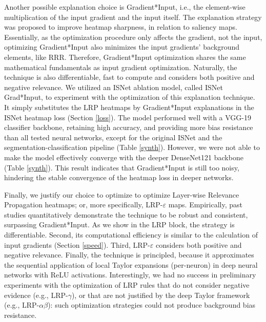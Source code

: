 \documentclass[fleqn,10pt]{wlscirep}
\begin{document}
{Another possible explanation choice is Gradient*Input, i.e., the element-wise multiplication of the input gradient and the input itself. The explanation strategy was proposed to improve heatmap sharpness, in relation to saliency maps\cite{GradInput}. Essentially, as the optimization procedure only affects the gradient, not the input, optimizing Gradient*Input also minimizes the input gradients' background elements, like RRR. Therefore, Gradient*Input optimization shares the same mathematical fundamentals as input gradient optimization. Naturally, the technique is also differentiable, fast to compute and considers both positive and negative relevance. We utilized an ISNet ablation model, called ISNet Grad*Input, to experiment with the optimization of this explanation technique. It simply substitutes the LRP heatmaps by Gradient*Input explanations in the ISNet heatmap loss (Section \ref{loss}). The model performed well with a VGG-19 classifier backbone, retaining high accuracy, and providing more bias resistance than all tested neural networks, except for the original ISNet and the segmentation-classification pipeline (Table \ref{synth}). However, we were not able to make the model effectively converge with the deeper DenseNet121 backbone (Table \ref{synth}). This result indicates that Gradient*Input is still too noisy, hindering the stable convergence of the heatmap loss in deeper networks.

Finally, we justify our choice to optimize to optimize Layer-wise Relevance Propagation heatmaps; or, more specifically, LRP-$\varepsilon$\cite{LRP} maps. Empirically, past studies quantitatively demonstrate the technique to be robust and consistent, surpassing Gradient*Input\cite{LRPRobustness}. As we show in the LRP block, the strategy is differentiable. Second, its computational efficiency is similar to the calculation of input gradients (Section \ref{speed}). Third, LRP-$\varepsilon$ considers both positive and negative relevance. Finally, the technique is principled, because it approximates the sequential application of local Taylor expansions (per-neuron) in deep neural networks with ReLU activations. Interestingly, we had no success in preliminary experiments with the optimization of LRP rules that do not consider negative evidence (e.g., LRP-$\gamma$\cite{LRPBook}), or that are not justified by the deep Taylor framework (e.g., LRP-$\alpha \beta$\cite{LRPBook}): such optimization strategies could not produce background bias resistance.

}
\end{document}
